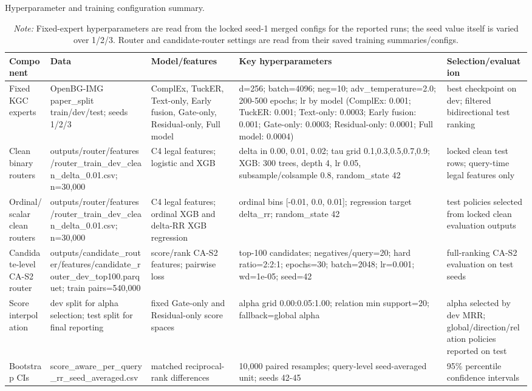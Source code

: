 \begin{table}[t]
\centering
\small
\caption{Hyperparameter and training configuration summary.}
\label{tab:supp_hyperparameter_training_config}
\setlength{\tabcolsep}{3pt}
\begin{tabular}{p{}p{}p{}p{}p{}}
\toprule
Component & Data & Model/features & Key hyperparameters & Selection/evaluation \\
\midrule
Fixed KGC experts & OpenBG-IMG paper\_split train/dev/test; seeds 1/2/3 & ComplEx, TuckER, Text-only, Early fusion, Gate-only, Residual-only, Full model & d=256; batch=4096; neg=10; adv\_temperature=2.0; 200-500 epochs; lr by model (ComplEx: 0.001; TuckER: 0.001; Text-only: 0.0003; Early fusion: 0.001; Gate-only: 0.0003; Residual-only: 0.0001; Full model: 0.0004) & best checkpoint on dev; filtered bidirectional test ranking \\
Clean binary routers & outputs/router/features/router\_train\_dev\_clean\_delta\_0.01.csv; n=30,000 & C4 legal features; logistic and XGB & delta in {0.00, 0.01, 0.02}; tau grid {0.1,0.3,0.5,0.7,0.9}; XGB: 300 trees, depth 4, lr 0.05, subsample/colsample 0.8, random\_state 42 & locked clean test rows; query-time legal features only \\
Ordinal/scalar clean routers & outputs/router/features/router\_train\_dev\_clean\_delta\_0.01.csv; n=30,000 & C4 legal features; ordinal XGB and delta-RR XGB regression & ordinal bins [-0.01, 0.0, 0.01]; regression target delta\_rr; random\_state 42 & test policies selected from locked clean evaluation outputs \\
Candidate-level CA-S2 router & outputs/candidate\_router/features/candidate\_router\_dev\_top100.parquet; train pairs=540,000 & score/rank CA-S2 features; pairwise loss & top-100 candidates; negatives/query=20; hard ratio=2:2:1; epochs=30; batch=2048; lr=0.001; wd=1e-05; seed=42 & full-ranking CA-S2 evaluation on test seeds \\
Score interpolation & dev split for alpha selection; test split for final reporting & fixed Gate-only and Residual-only score spaces & alpha grid 0.00:0.05:1.00; relation min support=20; fallback=global alpha & alpha selected by dev MRR; global/direction/relation policies reported on test \\
Bootstrap CIs & score\_aware\_per\_query\_rr\_seed\_averaged.csv & matched reciprocal-rank differences & 10,000 paired resamples; query-level seed-averaged unit; seeds 42-45 & 95\% percentile confidence intervals \\
\bottomrule
\end{tabular}
\vspace{0.4ex}
\caption*{\footnotesize \textit{Note:} Fixed-expert hyperparameters are read from the locked seed-1 merged configs for the reported runs; the seed value itself is varied over 1/2/3. Router and candidate-router settings are read from their saved training summaries/configs.}
\end{table}
